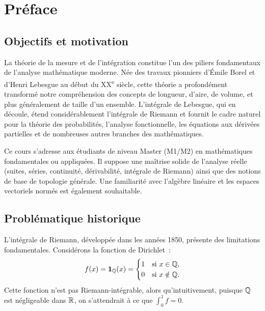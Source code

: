 \chapter*{Pr\'eface}

\section*{Objectifs et motivation}

La th\'eorie de la mesure et de l'int\'egration constitue l'un des piliers fondamentaux
de l'analyse math\'ematique moderne. N\'ee des travaux pionniers d'\'Emile Borel et
d'Henri Lebesgue au d\'ebut du XX\textsuperscript{e} si\`ecle, cette th\'eorie a
profond\'ement transform\'e notre compr\'ehension des concepts de longueur, d'aire, de
volume, et plus g\'en\'eralement de \og taille \fg d'un ensemble. L'int\'egrale de
Lebesgue, qui en d\'ecoule, \'etend consid\'erablement l'int\'egrale de Riemann et
fournit le cadre naturel pour la th\'eorie des probabilit\'es, l'analyse fonctionnelle,
les \'equations aux d\'eriv\'ees partielles et de nombreuses autres branches des
math\'ematiques.

Ce cours s'adresse aux \'etudiants de niveau Master (M1/M2) en math\'ematiques
fondamentales ou appliqu\'ees. Il suppose une ma\^itrise solide de l'analyse r\'eelle
(suites, s\'eries, continuit\'e, d\'erivabilit\'e, int\'egrale de Riemann) ainsi que des
notions de base de topologie g\'en\'erale. Une familiarit\'e avec l'alg\`ebre lin\'eaire
et les espaces vectoriels norm\'es est \'egalement souhaitable.

\section*{Probl\'ematique historique}

L'int\'egrale de Riemann, d\'evelopp\'ee dans les ann\'ees 1850, pr\'esente des limitations
fondamentales. Consid\'erons la fonction de Dirichlet~:
\[
f(x) = \mathbf{1}_{\mathbb{Q}}(x) = \begin{cases} 1 & \text{si } x \in \mathbb{Q}, \\ 0 & \text{si } x \notin \mathbb{Q}. \end{cases}
\]
Cette fonction n'est pas Riemann-int\'egrable, alors qu'intuitivement, puisque $\mathbb{Q}$
est \og n\'egligeable \fg dans $\mathbb{R}$, on s'attendrait \`a ce que $\int_0^1 f = 0$.

